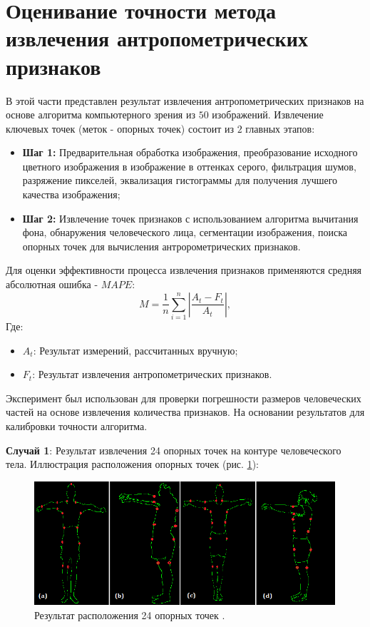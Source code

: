 \section{Оценивание точности метода извлечения антропометрических признаков}
В этой части представлен результат извлечения антропометрических признаков на основе алгоритма компьютерного зрения из $50$ изображений. Извлечение ключевых точек (меток - опорных точек) состоит из $2$ главных этапов:

\begin{itemize}
	\item \textbf{Шаг 1:} Предварительная обработка изображения, преобразование исходного цветного изображения в изображение в оттенках серого, фильтрация шумов, разряжение пикселей, эквализация гистограммы для получения лучшего качества изображения;
	\item \textbf{Шаг 2: } Извлечение точек признаков с использованием алгоритма вычитания фона, обнаружения человеческого лица, сегментации изображения, поиска опорных точек для вычисления антророметрических признаков.
\end{itemize}

Для оценки эффективности процесса извлечения признаков применяются средняя абсолютная ошибка - $MAPE$:
\begin{equation}\label{eq26}
M=\frac{1}{n}\sum^n_{i=1}\left|\frac{A_t-F_t}{A_t}\right|,
\end{equation}
Где:

\begin{itemize}
	\item $A_t$: Результат измерений, рассчитанных вручную;
	\item $F_t$: Результат извлечения антропометрических признаков.
\end{itemize}
Эксперимент был использован для проверки погрешности размеров человеческих частей на основе извлечения количества признаков. На основании результатов для калибровки точности алгоритма.

\textbf{Случай 1}: Результат извлечения 24 опорных точек на контуре человеческого тела. Иллюстрация расположения опорных точек (рис. \ref{img15}): 
\begin{figure}[ht!]
\centering
\includegraphics [scale=0.8] {images/h15.png}
\begin{center}
\caption{Результат расположения 24 опорных точек \cite{long1,long2}.} \label{img15}
\end{center}
\end{figure}


